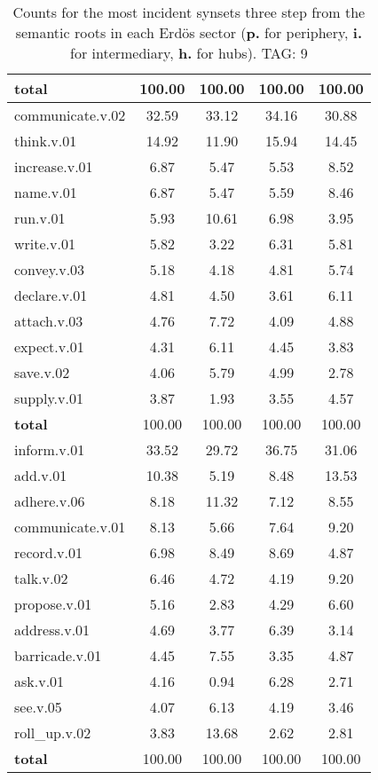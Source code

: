 \begin{table}[h!]
\begin{center}
\begin{tabular}{| l || c | c | c | c |}
{{\bf total}} & 100.00  & 100.00  & 100.00  & 100.00 \\\hline\hline\hline
communicate.v.02 & 32.59  & 33.12  & 34.16  & 30.88 \\\hline
think.v.01 & 14.92  & 11.90  & 15.94  & 14.45 \\\hline
increase.v.01 & 6.87  & 5.47  & 5.53  & 8.52 \\\hline
name.v.01 & 6.87  & 5.47  & 5.59  & 8.46 \\\hline
run.v.01 & 5.93  & 10.61  & 6.98  & 3.95 \\\hline
write.v.01 & 5.82  & 3.22  & 6.31  & 5.81 \\\hline
convey.v.03 & 5.18  & 4.18  & 4.81  & 5.74 \\\hline
declare.v.01 & 4.81  & 4.50  & 3.61  & 6.11 \\\hline
attach.v.03 & 4.76  & 7.72  & 4.09  & 4.88 \\\hline
expect.v.01 & 4.31  & 6.11  & 4.45  & 3.83 \\\hline
save.v.02 & 4.06  & 5.79  & 4.99  & 2.78 \\\hline
supply.v.01 & 3.87  & 1.93  & 3.55  & 4.57 \\\hline\hline
{{\bf total}} & 100.00  & 100.00  & 100.00  & 100.00 \\\hline\hline\hline
inform.v.01 & 33.52  & 29.72  & 36.75  & 31.06 \\\hline
add.v.01 & 10.38  & 5.19  & 8.48  & 13.53 \\\hline
adhere.v.06 & 8.18  & 11.32  & 7.12  & 8.55 \\\hline
communicate.v.01 & 8.13  & 5.66  & 7.64  & 9.20 \\\hline
record.v.01 & 6.98  & 8.49  & 8.69  & 4.87 \\\hline
talk.v.02 & 6.46  & 4.72  & 4.19  & 9.20 \\\hline
propose.v.01 & 5.16  & 2.83  & 4.29  & 6.60 \\\hline
address.v.01 & 4.69  & 3.77  & 6.39  & 3.14 \\\hline
barricade.v.01 & 4.45  & 7.55  & 3.35  & 4.87 \\\hline
ask.v.01 & 4.16  & 0.94  & 6.28  & 2.71 \\\hline
see.v.05 & 4.07  & 6.13  & 4.19  & 3.46 \\\hline
roll\_up.v.02 & 3.83  & 13.68  & 2.62  & 2.81 \\\hline\hline
{{\bf total}} & 100.00  & 100.00  & 100.00  & 100.00 \\\hline
\end{tabular}
\caption{Counts for the most incident synsets three step from the semantic roots in each Erd\"os sector ({\bf p.} for periphery, {\bf i.} for intermediary, {\bf h.} for hubs). TAG: 9}
\end{center}
\end{table}